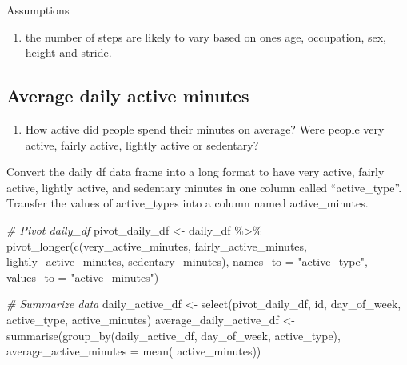 \documentclass[
]{article}
\newenvironment{Shaded}{\begin{snugshade}}{\end{snugshade}}
\newcommand{\AttributeTok}[1]{\textcolor[rgb]{0.77,0.63,0.00}{#1}}
\newcommand{\CommentTok}[1]{\textcolor[rgb]{0.56,0.35,0.01}{\textit{#1}}}
\newcommand{\FunctionTok}[1]{\textcolor[rgb]{0.00,0.00,0.00}{#1}}
\newcommand{\NormalTok}[1]{#1}
\newcommand{\OtherTok}[1]{\textcolor[rgb]{0.56,0.35,0.01}{#1}}
\newcommand{\SpecialCharTok}[1]{\textcolor[rgb]{0.00,0.00,0.00}{#1}}
\newcommand{\StringTok}[1]{\textcolor[rgb]{0.31,0.60,0.02}{#1}}
\providecommand{\tightlist}{%
  \setlength{\itemsep}{0pt}\setlength{\parskip}{0pt}}
\begin{document}
Assumptions

\begin{enumerate}
\def\labelenumi{\arabic{enumi}.}
\tightlist
\item
  the number of steps are likely to vary based on ones age, occupation,
  sex, height and stride.
\end{enumerate}

\hypertarget{average-daily-active-minutes}{%
\subsection{Average daily active
minutes}\label{average-daily-active-minutes}}

\begin{enumerate}
\def\labelenumi{\arabic{enumi}.}
\tightlist
\item
  How active did people spend their minutes on average? Were people very
  active, fairly active, lightly active or sedentary?
\end{enumerate}

Convert the daily df data frame into a long format to have very active,
fairly active, lightly active, and sedentary minutes in one column
called ``active\_type''. Transfer the values of active\_types into a
column named active\_minutes.

\begin{Shaded}
\begin{Highlighting}[]
\CommentTok{\# Pivot daily\_df}
\NormalTok{pivot\_daily\_df }\OtherTok{\textless{}{-}}\NormalTok{ daily\_df }\SpecialCharTok{\%\textgreater{}\%}
  \FunctionTok{pivot\_longer}\NormalTok{(}\FunctionTok{c}\NormalTok{(very\_active\_minutes, fairly\_active\_minutes,}
\NormalTok{                 lightly\_active\_minutes, sedentary\_minutes), }
               \AttributeTok{names\_to =} \StringTok{"active\_type"}\NormalTok{, }\AttributeTok{values\_to =} \StringTok{"active\_minutes"}\NormalTok{)}
\end{Highlighting}
\end{Shaded}

\begin{Shaded}
\begin{Highlighting}[]
\CommentTok{\# Summarize data}
\NormalTok{daily\_active\_df }\OtherTok{\textless{}{-}} \FunctionTok{select}\NormalTok{(pivot\_daily\_df, id, day\_of\_week,}
\NormalTok{                          active\_type, active\_minutes)}
\NormalTok{average\_daily\_active\_df }\OtherTok{\textless{}{-}} \FunctionTok{summarise}\NormalTok{(}\FunctionTok{group\_by}\NormalTok{(daily\_active\_df, day\_of\_week,}
\NormalTok{                                              active\_type), }
                                     \AttributeTok{average\_active\_minutes =} \FunctionTok{mean}\NormalTok{(}
\NormalTok{                                       active\_minutes))}
\end{Highlighting}
\end{Shaded}
\end{document}

